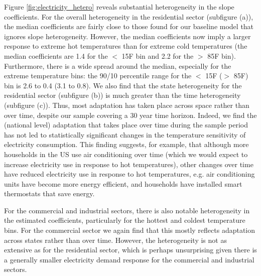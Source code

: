 \documentclass[11pt]{article}
\begin{document}
Figure \ref{fig:electricity_hetero} reveals substantial heterogeneity in the slope coefficients. For the overall heterogeneity in the residential sector (subfigure (a)), the median coefficients are fairly close to those found for our baseline model that ignores slope heterogeneity. However, the median coefficients now imply a larger response to extreme hot temperatures than for extreme cold temperatures (the median coefficients are 1.4 for the $<$ 15\degree F bin and 2.2 for the $>$ 85\degree F bin). Furthermore, there is a wide spread around the median, especially for the extreme temperature bins: the 90/10 percentile range for the $<$ 15\degree F ($>$ 85\degree F) bin is 2.6 to 0.4 (3.1 to 0.8). We also find that the state heterogeneity for the residential sector (subfigure (b)) is much greater than the time heterogeneity (subfigure (c)). Thus, most adaptation has taken place across space rather than over time, despite our sample covering a 30 year time horizon. Indeed, we find the (national level) adaptation that takes place over time during the sample period has not led to statistically significant changes in the temperature sensitivity of electricity consumption. This finding suggests, for example, that although more households in the US use air conditioning over time (which we would expect to increase electricity use in response to hot temperatures), other changes over time have reduced electricity use in response to hot temperatures, e.g. air conditioning units have become more energy efficient, %
and households have installed smart thermostats that save energy.

For the commercial and industrial sectors, there is also notable heterogeneity in the estimated coefficients, particularly for the hottest and coldest temperature bins. For the commercial sector we again find that this mostly reflects adaptation across states rather than over time. However, the heterogeneity is not as extensive as for the residential sector, which is perhaps unsurprising given there is a generally smaller electricity demand response for the commercial and industrial sectors.
\end{document}
